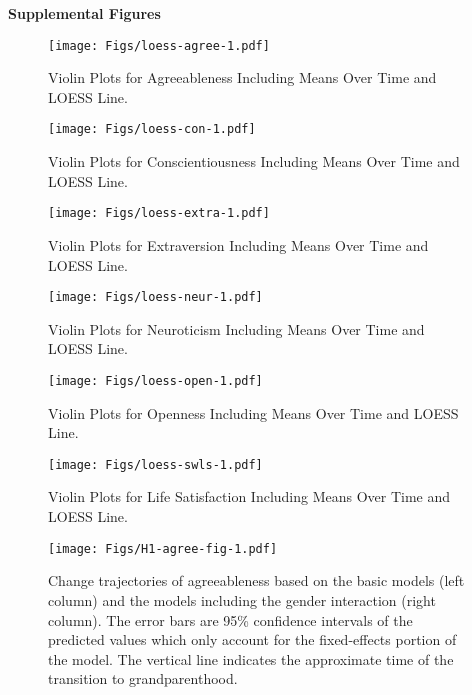\documentclass[
  english,
  man, noextraspace]{apa7}
\newenvironment{lltable}{\begin{landscape}\begin{center}\begin{ThreePartTable}}{\end{ThreePartTable}\end{center}\end{landscape}}
\begin{document}
\begin{appendix}
\begin{lltable}
{}

\end{lltable}

\noindent \textbf{Supplemental Figures}




\begin{figure}
\centering
\texttt{[image: Figs/loess-agree-1.pdf]}
\caption{\label{fig:loess-agree}Violin Plots for Agreeableness Including Means
Over Time and LOESS Line.}
\end{figure}




\begin{figure}
\centering
\texttt{[image: Figs/loess-con-1.pdf]}
\caption{\label{fig:loess-con}Violin Plots for Conscientiousness Including Means
Over Time and LOESS Line.}
\end{figure}




\begin{figure}
\centering
\texttt{[image: Figs/loess-extra-1.pdf]}
\caption{\label{fig:loess-extra}Violin Plots for Extraversion Including Means Over
Time and LOESS Line.}
\end{figure}




\begin{figure}
\centering
\texttt{[image: Figs/loess-neur-1.pdf]}
\caption{\label{fig:loess-neur}Violin Plots for Neuroticism Including Means Over
Time and LOESS Line.}
\end{figure}




\begin{figure}
\centering
\texttt{[image: Figs/loess-open-1.pdf]}
\caption{\label{fig:loess-open}Violin Plots for Openness Including Means Over Time
and LOESS Line.}
\end{figure}




\begin{figure}
\centering
\texttt{[image: Figs/loess-swls-1.pdf]}
\caption{\label{fig:loess-swls}Violin Plots for Life Satisfaction Including Means
Over Time and LOESS Line.}
\end{figure}








\begin{figure}
\centering
\texttt{[image: Figs/H1-agree-fig-1.pdf]}
\caption{\label{fig:H1-agree-fig}Change trajectories of agreeableness based on the
basic models (left column) and the models including the gender
interaction (right column). The error bars are 95\% confidence intervals
of the predicted values which only account for the fixed-effects portion
of the model. The vertical line indicates the approximate time of the
transition to grandparenthood.}
\end{figure}











\end{appendix}
\end{document}
